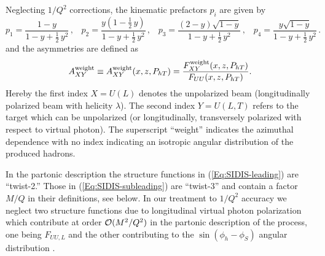\documentclass[a4paper,11pt]{article}
\newcommand{\blue}[1]{{\color{blue} #1}}
\newcommand{\be}{\begin{equation}}
\newcommand{\ee}{\end{equation}}
\newcommand{\ba}{\begin{eqnarray}}
\newcommand{\ea}{\end{eqnarray}}
\newcommand{\slim}{\mskip 1.5mu}       %
\newcommand{\ps}[1]{\blue{ #1}}
\def\Phperp{P_{hT}}
\begin{document}
Neglecting $1/Q^2$ corrections, the kinematic prefactors $p_i$ are given by 
\be\label{Eq:y-prefactors}
	p_1 = \frac{1-y}{1-y+\frac12\,y^2} 		\, , \;\;\;
	p_2 = \frac{y(1-\frac12\,y)}{1-y+\frac12\,y^2}	\, , \;\;\;
	p_3 = \frac{(2-y)\sqrt{1-y}}{1-y+\frac12\,y^2} 	\, , \;\;\;
	p_4 = \frac{y\sqrt{1-y}}{1-y+\frac12\,y^2}     	\, .
\ee
and the asymmetries are defined as 
\be
	A_{XY}^{\rm weight}\equiv A_{XY}^{\rm weight}(x,z,\Phperp)=
	\frac{F_{XY}^{\rm weight}(x,z,\Phperp)}{F_{UU}(x,z,\Phperp)}.
\ee
Hereby the first index $X=U(L)$ denotes the unpolarized beam
(longitudinally polarized beam with helicity $\lambda$).
The second index $Y=U(L,T)$ refers to the target which can be unpolarized
(or longitudinally, transversely polarized with respect to virtual photon).
The superscript ``weight'' indicates the azimuthal dependence with no index 
indicating an isotropic angular distribution of the produced hadrons.

\ps{In the partonic description the structure functions in 
(\ref{Eq:SIDIS-leading})    are ``twist-2.'' Those in
(\ref{Eq:SIDIS-subleading}) are ``twist-3'' and contain a
factor $M/Q$ in their definitions, see below. In our treatment to $1/Q^2$ 
accuracy we neglect two structure functions due to longitudinal virtual 
photon polarization which contribute at order ${\cal O}(M^2/Q^2)$ in the 
partonic description of the process, one being $F_{UU,L}$ and the other 
contributing to the $\sin(\phi_h-\phi_S)$ angular distribution 
\cite{Bacchetta:2006tn}.}
\end{document}
